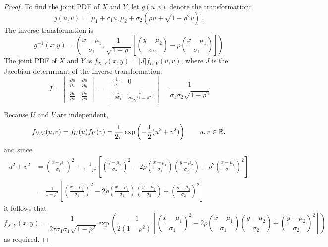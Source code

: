 \begin{proof}
To find the joint PDF of $X$ and $Y$, let $g(u,v)$ denote the transformation:
\[
g(u,v) = \big[\mu_1 + \sigma_1 u, \mu_2 + \sigma_2(\rho u +\sqrt{1-\rho^2}v)\big].
\]
The inverse transformation is
\[
g^{-1}(x,y) 
	= \left(\frac{x-\mu_1}{\sigma_1}, \frac{1}{\sqrt{1-\rho^2}}
  \left[\left(\frac{y-\mu_2}{\sigma_2}\right) -\rho\left(\frac{x-\mu_1}{\sigma_1}\right)\right]\right)
\]
The joint PDF of $X$ and $Y$ is $f_{X,Y}(x,y) = |J|f_{U,V}(u,v)$, where $J$ is the Jacobian determinant of the inverse transformation:
\[
J=\begin{vmatrix}
\displaystyle\frac{\partial u}{\partial x}  & \displaystyle\frac{\partial u}{\partial y}  \\[2ex]
\displaystyle\frac{\partial v}{\partial x}  & \displaystyle\frac{\partial v}{\partial y} 
\end{vmatrix}
=
\begin{vmatrix}
\displaystyle\frac{1}{\sigma_1}  		& \displaystyle0 \\[2ex]
\displaystyle\frac{1}{\rho\sigma_1}	& \displaystyle\frac{1}{\sigma_2\sqrt{1-\rho^2}} 
\end{vmatrix}
=
\frac{1}{\sigma_1\sigma_2\sqrt{1-\rho^2}}
\]

Because $U$ and $V$ are independent,
\[
f_{U,V}(u,v)=f_U(u)f_V(v) = \frac{1}{2\pi}\exp\left(-\frac{1}{2}(u^2 + v^2)\right) \qquad  u,v\in\mathbb{R}.
\]
and since
\begin{align*}
u^2 +v^2 
	&  = \left(\frac{x-\mu_1}{\sigma_1}\right)^2 
			+ \frac{1}{1-\rho^2}\left[ 
				\left(\frac{y-\mu_2}{\sigma_2}\right)^2 
					- 2\rho\left(\frac{x-\mu_1}{\sigma_1}\right)\left(\frac{y-\mu_2}{\sigma_{2}}\right) 
						+\rho^2\left(\frac{x-\mu_1}{\sigma_1}\right)^2 \right]  \\
	& =  \frac{1}{1-\rho^2}\left[\left(\frac{x-\mu_1}{\sigma_1}\right)^2 
				-2\rho\left(\frac{x-\mu_1}{\sigma_1}\right)\left(\frac{y-\mu_2}{\sigma_2}\right) 
					+\left(\frac{y-\mu_2}{\sigma_2}\right)^2\right]
\end{align*}
it follows that
\[
f_{X,Y}(x,y)
	= \frac{1}{2\pi\sigma_1\sigma_1\sqrt{1-\rho^2}}
		\exp\left(\frac{-1}{2(1-\rho^2)}\left[\left(\frac{x-\mu_1}{\sigma_1}\right)^2 
			-2\rho\left(\frac{x-\mu_1}{\sigma_1}\right)\left(\frac{y-\mu_2}{\sigma_2}\right) 
				+\left(\frac{y-\mu_2}{\sigma_2}\right)^2 \right]\right)
\]
\normalsize
as required.
\end{proof}

